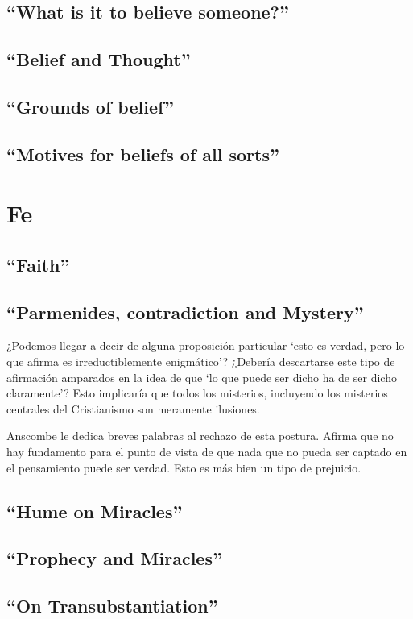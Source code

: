 \documentclass[./main.tex]{subfiles}
\begin{document}
\subsection{``What is it to believe someone?''}

\subsection{``Belief and Thought''}

\subsection{``Grounds of belief''}

\subsection{``Motives for beliefs of all sorts''}

\section{Fe}

\subsection{``Faith''}

\subsection{``Parmenides, contradiction and Mystery''}

¿Podemos llegar a decir de alguna proposición particular `esto es verdad, pero
lo que afirma es irreductiblemente enigmático'? ¿Debería descartarse este tipo
de afirmación amparados en la idea de que `lo que puede ser dicho ha de ser
dicho claramente'? Esto implicaría que todos los misterios, incluyendo los
misterios centrales del Cristianismo son meramente ilusiones.

Anscombe le dedica breves palabras al rechazo de esta postura. Afirma que no
hay fundamento para el punto de vista de que nada que no pueda ser captado en
el pensamiento puede ser verdad. Esto es más bien un tipo de prejuicio.

\subsection{``Hume on Miracles''}

\subsection{``Prophecy and Miracles''}

\subsection{``On Transubstantiation''}
\end{document}
